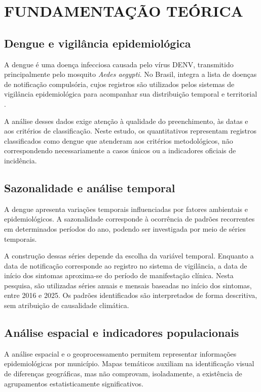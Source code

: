 
\begingroup
\let\clearpage\relax
\chapter{FUNDAMENTAÇÃO TEÓRICA}
\label{sec:fundamentacao}
\endgroup

\section{Dengue e vigilância epidemiológica}


A dengue é uma doença infecciosa causada pelo vírus DENV, transmitido principalmente pelo mosquito \textit{Aedes aegypti}. No Brasil, integra a lista de doenças de notificação compulsória, cujos registros são utilizados pelos sistemas de vigilância epidemiológica para acompanhar sua distribuição temporal e territorial \cite{BrasilGuiaVigilancia}.

A análise desses dados exige atenção à qualidade do preenchimento, às datas e aos critérios de classificação. Neste estudo, os quantitativos representam registros classificados como dengue que atenderam aos critérios metodológicos, não correspondendo necessariamente a casos únicos ou a indicadores oficiais de incidência.

\section{Sazonalidade e análise temporal}

A dengue apresenta variações temporais influenciadas por fatores ambientais e epidemiológicos. A sazonalidade corresponde à ocorrência de padrões recorrentes em determinados períodos do ano, podendo ser investigada por meio de séries temporais.

A construção dessas séries depende da escolha da variável temporal. Enquanto a data de notificação corresponde ao registro no sistema de vigilância, a data de início dos sintomas aproxima-se do período de manifestação clínica. Nesta pesquisa, são utilizadas séries anuais e mensais baseadas no início dos sintomas, entre 2016 e 2025. Os padrões identificados são interpretados de forma descritiva, sem atribuição de causalidade climática.

\section{Análise espacial e indicadores populacionais}

A análise espacial e o geoprocessamento permitem representar informações epidemiológicas por município. Mapas temáticos auxiliam na identificação visual de diferenças geográficas, mas não comprovam, isoladamente, a existência de agrupamentos estatisticamente significativos.


